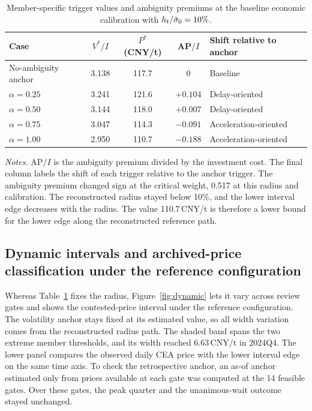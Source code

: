 \begin{table}[!t]
\caption{Member-specific trigger values and ambiguity premiums at the baseline economic calibration with $h_t/\bar{\sigma}_0=10\%$.}
\label{tab:members}
\centering
\scriptsize
\setlength{\tabcolsep}{3pt}
\begin{tabular}{@{}lcccl@{}}
\toprule
Case & $V^{*}/I$ & $P^{*}$ (CNY/t) & AP$/I$ & Shift relative to anchor\\
\midrule
No-ambiguity anchor & 3.138 & 117.7 & 0 & Baseline\\
$\alpha=0.25$ & 3.241 & 121.6 & $+0.104$ & Delay-oriented\\
$\alpha=0.50$ & 3.144 & 118.0 & $+0.007$ & Delay-oriented\\
$\alpha=0.75$ & 3.047 & 114.3 & $-0.091$ & Acceleration-oriented\\
$\alpha=1.00$ & 2.950 & 110.7 & $-0.188$ & Acceleration-oriented\\
\bottomrule
\end{tabular}
\par\smallskip
\parbox{\columnwidth}{\scriptsize\emph{Notes.} AP$/I$ is the ambiguity premium divided by the investment cost. The final column labels the shift of each trigger relative to the anchor trigger. The ambiguity premium changed sign at the critical weight, 0.517 at this radius and calibration. The reconstructed radius stayed below 10\%, and the lower interval edge decreases with the radius. The value 110.7\,CNY/t is therefore a lower bound for the lower edge along the reconstructed reference path.}
\end{table}

\subsection{Dynamic intervals and archived-price classification under the reference configuration}

Whereas Table~\ref{tab:members} fixes the radius, Figure~\ref{fig:dynamic} lets it vary across review gates and shows the contested-price interval under the reference configuration. The volatility anchor stays fixed at its estimated value, so all width variation comes from the reconstructed radius path. The shaded band spans the two extreme member thresholds, and its width reached 6.63\,CNY/t in 2024Q4. The lower panel compares the observed daily CEA price with the lower interval edge on the same time axis. To check the retrospective anchor, an as-of anchor estimated only from prices available at each gate was computed at the 14 feasible gates. Over these gates, the peak quarter and the unanimous-wait outcome stayed unchanged.

